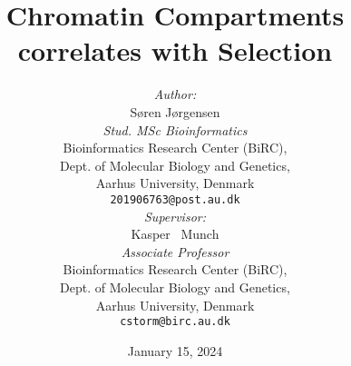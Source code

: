 
\usepackage{arxiv}

\usepackage[utf8]{inputenc} %
\usepackage[T1]{fontenc}    %
\usepackage[hidelinks]{hyperref}       %
\usepackage{url}            %
\usepackage{booktabs}       %
\usepackage{amsfonts}       %
\usepackage{nicefrac}       %
\usepackage{microtype}      %
\usepackage{lipsum}		
\usepackage{graphicx}
\usepackage{tikz}
\usepackage[numbers]{natbib}
\usepackage{doi}
\usepackage{amsmath}
\usepackage{amssymb}
\usepackage{svg}
\usepackage{verbatim}
\usepackage{subcaption}
\usepackage[linesnumbered, ruled, vlined]{algorithm2e}
\renewcommand{\algorithmautorefname}{Algorithm}
\captionsetup{font=small, labelfont=bf}
\captionsetup[sub]{font=small, labelfont=bf} 
\captionsetup[subfigure]{justification=justified, singlelinecheck=false, skip=3pt}



\title{Chromatin Compartments correlates with Selection}

\date{January 15, 2024}		

\author{{\emph{Author:}\\
    Søren Jørgensen}	\\
    \emph{Stud. MSc Bioinformatics} \\
    Bioinformatics Research Center (BiRC),\\
    Dept. of Molecular Biology and Genetics,\\
	Aarhus University, Denmark \\
	\texttt{201906763@post.au.dk} \\
    \And
    {\emph{Supervisor:}\\
    Kasper ~Munch}	\\
    \emph{Associate Professor} \\
    Bioinformatics Research Center (BiRC),\\
    Dept. of Molecular Biology and Genetics,\\
	Aarhus University, Denmark \\
	\texttt{cstorm@birc.au.dk} \\
}


\renewcommand{\headeright}{MSc Autumn2024}
\renewcommand{\undertitle}{30 ECTS Master's Thesis, Autumn 2024}
\renewcommand{\shorttitle}{Chromatin Compartments and selection}


